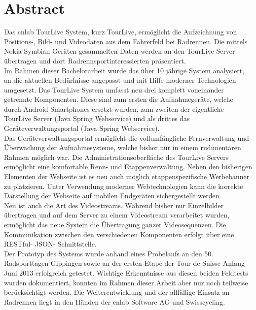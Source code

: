 \chapter*{Abstract}
Das cnlab TourLive System, kurz TourLive, ermöglicht die Aufzeichnung von Positions-, Bild- und Videodaten aus dem Fahrerfeld bei Radrennen. Die mittels Nokia Symbian Geräten gesammelten Daten werden an den TourLive Server übertragen und dort Radrennsportinteressierten präsentiert.
\\

Im Rahmen dieser Bachelorarbeit wurde das über 10 jährige System analysiert, an die aktuellen Bedürfnisse angepasst und mit Hilfe moderner Technologien umgesetzt. Das TourLive System umfasst neu drei komplett voneinander getrennte Komponenten. Diese sind zum ersten die Aufnahmegeräte, welche durch Android Smartphones ersetzt wurden, zum zweiten der eigentliche TourLive Server (Java Spring Webservice) und als drittes das Geräteverwaltungsportal (Java Spring Webservice). 
\\

Das Geräteverwaltungsportal ermöglicht die vollumfängliche Fernverwaltung und Überwachung der Aufnahmesysteme, welche bisher nur in einem rudimentären Rahmen möglich war. Die Administrationsoberfläche des TourLive Servers ermöglicht eine komfortable Renn- und Etappenverwaltung. Neben den bisherigen Elementen der Webseite ist es neu auch möglich etappenspezifische Werbebanner zu platzieren. Unter Verwendung moderner Webtechnologien kann die korrekte  Darstellung der Webseite auf mobilen Endgeräten sichergestellt werden.
\\

Neu ist auch die Art des Videostreams. Während bisher nur Einzelbilder übertragen und auf dem Server zu einem Videostream verarbeitet wurden, ermöglicht das neue System die Übertragung ganzer Videosequenzen. Die Kommunikation zwischen den verschiedenen Komponenten erfolgt über eine RESTful- JSON- Schnittstelle. 
\\

Der Prototyp des Systems wurde anhand eines Probelaufs an den 50. Radsporttagen Gippingen sowie an der ersten Etape der Tour de Suisse Anfang Juni 2013 erfolgreich getestet. Wichtige Erkenntnisse aus diesen beiden Feldtests wurden dokumentiert, konnten im Rahmen dieser Arbeit aber nur noch teilweise berücksichtigt werden. Die Weiterentwicklung und der allfällige Einsatz an Radrennen liegt in den Händen der cnlab Software AG und Swisscycling.
